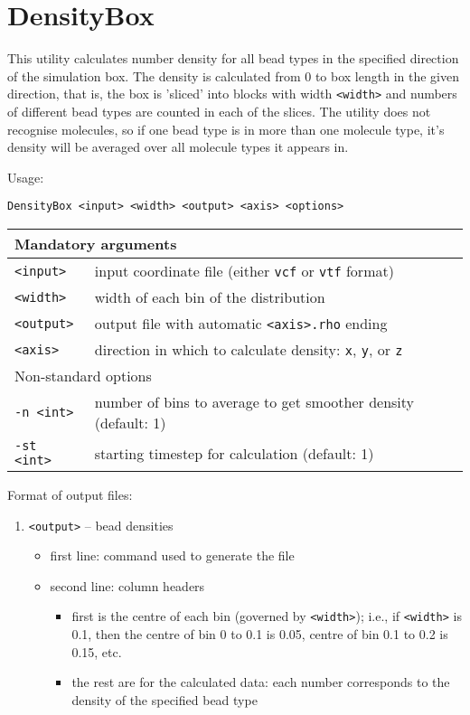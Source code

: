 \section{DensityBox} \label{sec:DensityBox}

This utility calculates number density for all bead types in the specified
direction of the simulation box. The density is calculated from 0 to box
length in the given direction, that is, the box is 'sliced' into blocks
with width \texttt{<width>} and numbers of different bead types are counted
in each of the slices. The utility does not recognise molecules, so if one
bead type is in more than one molecule type, it's density will be averaged
over all molecule types it appears in.

Usage:

\vspace{1em}
\noindent
\texttt{DensityBox <input> <width> <output> <axis> <options>}

\noindent
\begin{longtable}{p{}p{}}
  \toprule
  \multicolumn{2}{l}{Mandatory arguments} \\
  \midrule
  \texttt{<input>} & input coordinate file (either \texttt{vcf} or
    \texttt{vtf} format) \\
  \texttt{<width>} & width of each bin of the distribution \\
  \texttt{<output>} & output file with automatic \texttt{<axis>.rho} ending \\
  \texttt{<axis>} & direction in which to calculate density: \texttt{x},
    \texttt{y}, or \texttt{z} \\
  \toprule
  \multicolumn{2}{l}{Non-standard options} \\
  \midrule
  \texttt{-n <int>} & number of bins to average to get smoother density
    (default: 1) \\
  \texttt{-st <int>} & starting timestep for calculation (default: 1) \\
  \bottomrule
\end{longtable}

\noindent
Format of output files:
\begin{enumerate}[nosep,leftmargin=20pt]
  \item \texttt{<output>} -- bead densities
    \begin{itemize}[nosep,leftmargin=5pt]
      \item first line: command used to generate the file
      \item second line: column headers
        \begin{itemize}[nosep,leftmargin=5pt]
          \item first is the centre of each bin (governed by
            \texttt{<width>}); i.e., if \texttt{<width>} is 0.1,
            then the centre of bin 0 to 0.1 is 0.05, centre of bin 0.1 to
            0.2 is 0.15, etc.
          \item the rest are for the calculated data: each number
            corresponds to the density of the specified bead type
        \end{itemize}
    \end{itemize}
\end{enumerate}
